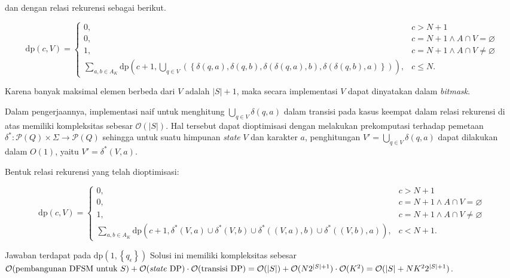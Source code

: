 \documentclass[../main_editorial.tex]{subfiles} %
\newcommand{\dpf}{\mathrm{dp}}
\newcommand{\bigO}[1]{\mathcal{O}(#1)}
\newcommand{\powerset}[1]{\mathcal{P}(#1)}
\begin{document}
dan dengan relasi rekurensi sebagai berikut.

$$
\dpf(c, V) = 
\begin{cases}
	0, & c > N + 1\\
	0, & c = N + 1\land A \cap V = \varnothing \\
	1, & c = N + 1\land A \cap V \neq \varnothing \\
	\displaystyle \sum_{a,b \in A_K} \dpf \left(c + 1, \bigcup\limits_{q \in V} \left(\left\{\delta\left(q, a\right), \delta\left(q, b\right), \delta\left(\delta\left(q, a\right), b\right), \delta\left(\delta\left(q, b\right), a\right) \right\} \right) \right), & c \le N.
\end{cases}
$$

Karena banyak maksimal elemen berbeda dari $ V $ adalah $ |S| + 1 $, maka secara implementasi $ V $ dapat dinyatakan dalam \textit{bitmask}.

Dalam pengerjaannya, implementasi naif untuk menghitung $ \bigcup_{q \in V}\delta(q, a) $ dalam transisi pada kasus keempat dalam relasi rekurensi di atas memiliki kompleksitas sebesar $ \bigO{|S|} $. Hal tersebut dapat dioptimisasi dengan melakukan prekomputasi terhadap pemetaan $ \delta^\ast : \powerset{Q} \times \Sigma \rightarrow \powerset{Q} $ sehingga untuk suatu himpunan \textit{state} $ V $ dan karakter $ a $, penghitungan $ V' = \bigcup_{q \in V} \delta(q, a) $ dapat dilakukan dalam $ O(1) $, yaitu $ V' = \delta^\ast(V, a) $.

Bentuk relasi rekurensi yang telah dioptimisasi:

$$
\dpf(c, V) = 
\begin{cases}
	0, & c > N + 1\\
	0, & c = N + 1\land A \cap V = \varnothing \\
	1, & c = N + 1\land A \cap V \neq \varnothing \\
	\displaystyle \sum_{a,b \in A_K} \dpf \left(c + 1, \delta^\ast\left(V, a\right) \cup \delta^\ast\left(V, b\right) \cup \delta^\ast\left(\left(V, a\right), b\right) \cup \delta^\ast\left(\left(V, b\right), a\right) \right), & c < N + 1.
\end{cases}
$$

Jawaban terdapat pada $ \dpf\left(1, \left\{q_\epsilon\right\} \right) $ Solusi ini memiliki kompleksitas sebesar $ \bigO{\textrm{pembangunan DFSM untuk }S} + \bigO{\textrm{\textit{state} DP}} \cdot \bigO{\textrm{transisi DP}} = \bigO{|S|} + \bigO{N2^{|S| + 1}} \cdot \bigO{K^2} = \bigO{|S| + NK^22^{|S| + 1}} $.
\end{document}
